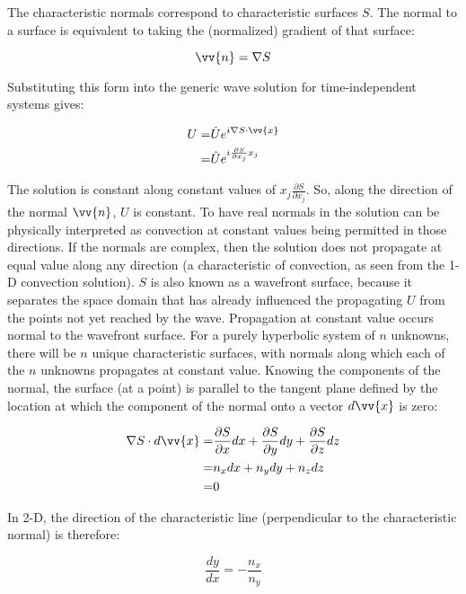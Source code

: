 \documentclass[10pt]{article}
\newcommand{\beq}{\begin{equation}}
\newcommand{\eeq}{\end{equation}}
\newcommand{\beqa}{\begin{equation}\begin{aligned}}
\newcommand{\eeqa}{\end{aligned}\end{equation}}
\begin{document}
\begin{flushleft}
The characteristic normals correspond to characteristic surfaces \(S\). The normal to a surface is equivalent to taking the (normalized) gradient of that surface:

\beq
\vv{n}=\nabla S
\eeq

Substituting this form into the generic wave solution for time-independent systems gives:

\beqa
U=&\hat{U}e^{i\nabla S\cdot\vv{x}}\\
=&\hat{U}e^{i\frac{\partial S}{\partial x_j}x_j}
\eeqa

The solution is constant along constant values of \(x_j\frac{\partial S}{\partial x_j}\). So, along the direction of the normal \(\vv{n}\), \(U\) is constant. To have real normals in the solution can be physically interpreted as convection at constant values being permitted in those directions. If the normals are complex, then the solution does not propagate at equal value along any direction (a characteristic of convection, as seen from the 1-D convection solution). \(S\) is also known as a wavefront surface, because it separates the space domain that has already influenced the propagating \(U\) from the points not yet reached by the wave. Propagation at constant value occurs normal to the wavefront surface. For a purely hyperbolic system of \(n\) unknowns, there will be \(n\) unique characteristic surfaces, with normals along which each of the \(n\) unknowns propagates at constant value. Knowing the components of the normal, the surface (at a point) is parallel to the tangent plane defined by the location at which the component of the normal onto a vector \(d\vv{x}\) is zero:

\beqa
\nabla S\cdot d\vv{x}=&\frac{\partial S}{\partial x}dx+\frac{\partial S}{\partial y}dy+\frac{\partial S}{\partial z}dz\\
=&n_xdx+n_ydy+n_zdz\\
=&0
\eeqa

In 2-D, the direction of the characteristic line (perpendicular to the characteristic normal) is therefore:

\beq
\frac{dy}{dx}=-\frac{n_x}{n_y}
\eeq


\end{flushleft}
\end{document}
